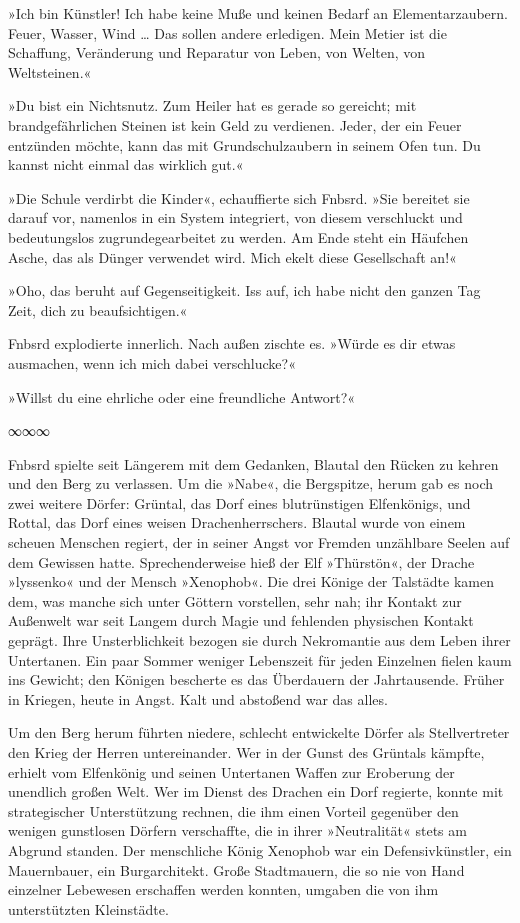 »Ich bin Künstler! Ich habe keine Muße und keinen Bedarf an Elementarzaubern. Feuer, Wasser, Wind … Das sollen andere erledigen. Mein Metier ist die Schaffung, Veränderung und Reparatur von Leben, von Welten, von Weltsteinen.«

»Du bist ein Nichtsnutz. Zum Heiler hat es gerade so gereicht; mit brandgefährlichen Steinen ist kein Geld zu verdienen. Jeder, der ein Feuer entzünden möchte, kann das mit Grundschulzaubern in seinem Ofen tun. Du kannst nicht einmal das wirklich gut.«

»Die Schule verdirbt die Kinder«, echauffierte sich Fnbsrd. »Sie bereitet sie darauf vor, namenlos in ein System integriert, von diesem verschluckt und bedeutungslos zugrundegearbeitet zu werden. Am Ende steht ein Häufchen Asche, das als Dünger verwendet wird. Mich ekelt diese Gesellschaft an!«

»Oho, das beruht auf Gegenseitigkeit. Iss auf, ich habe nicht den ganzen Tag Zeit, dich zu beaufsichtigen.«

Fnbsrd explodierte innerlich. Nach außen zischte es. »Würde es dir etwas ausmachen, wenn ich mich dabei verschlucke?«

»Willst du eine ehrliche oder eine freundliche Antwort?«

\begin{center}
∞∞∞
\end{center}

Fnbsrd spielte seit Längerem mit dem Gedanken, Blautal den Rücken zu kehren und den Berg zu verlassen. Um die »Nabe«, die Bergspitze, herum gab es noch zwei weitere Dörfer: Grüntal, das Dorf eines blutrünstigen Elfenkönigs, und Rottal, das Dorf eines weisen Drachenherrschers. Blautal wurde von einem scheuen Menschen regiert, der in seiner Angst vor Fremden unzählbare Seelen auf dem Gewissen hatte. Sprechenderweise hieß der Elf »Thürstön«, der Drache »lyssenko« und der Mensch »Xenophob«. Die drei Könige der Talstädte kamen dem, was manche sich unter Göttern vorstellen, sehr nah; ihr Kontakt zur Außenwelt war seit Langem durch Magie und fehlenden physischen Kontakt geprägt. Ihre Unsterblichkeit bezogen sie durch Nekromantie aus dem Leben ihrer Untertanen. Ein paar Sommer weniger Lebenszeit für jeden Einzelnen fielen kaum ins Gewicht; den Königen bescherte es das Überdauern der Jahrtausende. Früher in Kriegen, heute in Angst. Kalt und abstoßend war das alles.

Um den Berg herum führten niedere, schlecht entwickelte Dörfer als Stellvertreter den Krieg der Herren untereinander. Wer in der Gunst des Grüntals kämpfte, erhielt vom Elfenkönig und seinen Untertanen Waffen zur Eroberung der unendlich großen Welt. Wer im Dienst des Drachen ein Dorf regierte, konnte mit strategischer Unterstützung rechnen, die ihm einen Vorteil gegenüber den wenigen gunstlosen Dörfern verschaffte, die in ihrer »Neutralität« stets am Abgrund standen. Der menschliche König Xenophob war ein Defensivkünstler, ein Mauernbauer, ein Burgarchitekt. Große Stadtmauern, die so nie von Hand einzelner Lebewesen erschaffen werden konnten, umgaben die von ihm unterstützten Kleinstädte.


